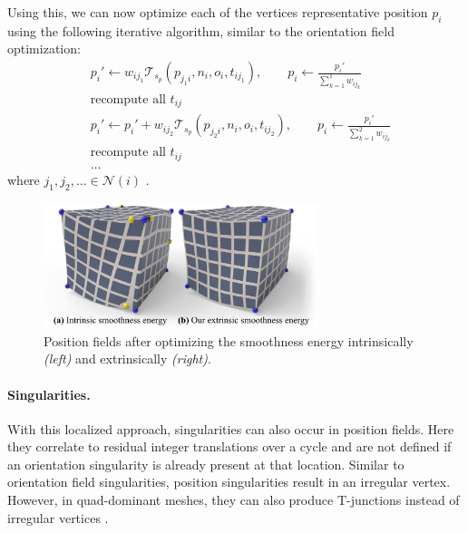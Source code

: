\documentclass{ACGSeminar}
\begin{document}
Using this, we can now optimize each of the vertices representative position $p_i$ using the following iterative algorithm, similar to the orientation field optimization:
\begin{equation*}
\begin{split}
	& p_i' \leftarrow w_{ij_1} \mathcal{T}_{s_p}(p_{j_1i}, n_i, o_i, t_{ij_1}), \qquad p_i \leftarrow \frac{p_i'}{\sum_{k=1}^1 w_{ij_k}} \\
	& \textrm{recompute all } t_{ij}\\
	& p_i' \leftarrow p_i' + w_{ij_2} \mathcal{T}_{s_p}(p_{j_2i}, n_i, o_i, t_{ij_2}), \qquad p_i \leftarrow \frac{p_i'}{\sum_{k=1}^2 w_{ij_k}} \\
	& \textrm{recompute all } t_{ij}\\
	& \dots
\end{split}
\end{equation*}
where $j_1, j_2, \dots \in \mathcal{N}(i)$ \cite{jakob2015instant}.

\begin{figure}[htb!]
	\begin{centering}
		\includegraphics[width=8cm]{img/position-field-illustration.png}\par
	\end{centering}
	\caption{Position fields after optimizing the smoothness energy intrinsically \textit{(left)} and extrinsically \textit{(right)}. \cite{jakob2015instant}}
	\label{fig:position-field-illustration}
\end{figure}

\paragraph{Singularities.}
With this localized approach, singularities can also occur in position fields. Here they correlate to residual integer translations over a cycle and are not defined if an orientation singularity is already present at that location. Similar to orientation field singularities, position singularities result in an irregular vertex. However, in quad-dominant meshes, they can also produce T-junctions instead of irregular vertices \cite{jakob2015instant}.
\end{document}
